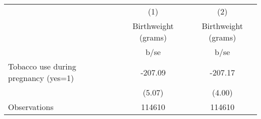 {
\def\sym#1{\ifmmode^{#1}\else\(^{#1}\)\fi}
\begin{tabular}{l*{2}{c}}
\hline\hline
                                                  &\multicolumn{1}{c}{(1)}&\multicolumn{1}{c}{(2)}\\
                                                  &\multicolumn{1}{c}{Birthweight (grams)}&\multicolumn{1}{c}{Birthweight (grams)}\\
                                                  &        b/se&        b/se\\
\hline
Tobacco use during pregnancy (yes=1)              &     -207.09&     -207.17\\
                                                  &      (5.07)&      (4.00)\\
\hline
Observations                                      &      114610&      114610\\
\hline\hline
\end{tabular}
}
